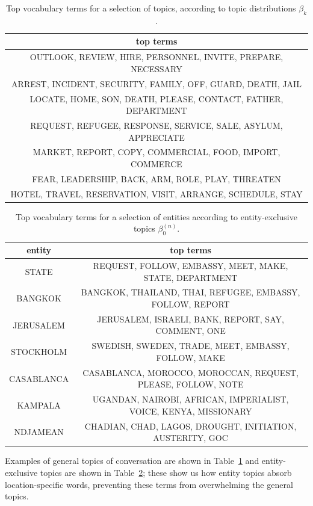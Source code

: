 \begin{table}
\centering
\small
\begin{tabular}{c}
\toprule
top terms \\
\midrule
OUTLOOK, REVIEW, HIRE, PERSONNEL, INVITE, PREPARE, NECESSARY \\
ARREST, INCIDENT, SECURITY, FAMILY, OFF, GUARD, DEATH, JAIL \\
LOCATE, HOME, SON, DEATH, PLEASE, CONTACT, FATHER, DEPARTMENT \\
REQUEST, REFUGEE, RESPONSE, SERVICE, SALE, ASYLUM, APPRECIATE \\
MARKET, REPORT, COPY, COMMERCIAL, FOOD, IMPORT, COMMERCE \\
FEAR, LEADERSHIP, BACK, ARM, ROLE, PLAY, THREATEN \\
HOTEL, TRAVEL, RESERVATION, VISIT, ARRANGE, SCHEDULE, STAY \\
\bottomrule
\end{tabular}
\label{tab:topics}
\caption{Top vocabulary terms for a selection of topics, according to topic distributions $\beta_k$.}
\end{table}

\begin{table}
\centering
\small
\begin{tabular}{cc}
\toprule
entity & top terms \\
\midrule
STATE & REQUEST, FOLLOW, EMBASSY, MEET, MAKE, STATE, DEPARTMENT \\
BANGKOK & BANGKOK, THAILAND, THAI, REFUGEE, EMBASSY, FOLLOW, REPORT \\
JERUSALEM & JERUSALEM, ISRAELI, BANK, REPORT, SAY, COMMENT, ONE \\
STOCKHOLM & SWEDISH, SWEDEN, TRADE, MEET, EMBASSY, FOLLOW, MAKE \\
CASABLANCA & CASABLANCA, MOROCCO, MOROCCAN, REQUEST, PLEASE, FOLLOW, NOTE \\
KAMPALA & UGANDAN, NAIROBI, AFRICAN, IMPERIALIST, VOICE, KENYA, MISSIONARY \\
NDJAMEAN & CHADIAN, CHAD, LAGOS, DROUGHT, INITIATION, AUSTERITY, GOC \\
\bottomrule
\end{tabular}
\label{tab:entities}
\caption{Top vocabulary terms for a selection of entities according to entity-exclusive topics $\beta^{(n)}_0$.}
\end{table}

Examples of general topics of conversation are shown in Table~\ref{tab:topics} and entity-exclusive topics are shown in Table~\ref{tab:entities}; these show us how entity topics absorb location-specific words, preventing these terms from overwhelming the general topics.  

